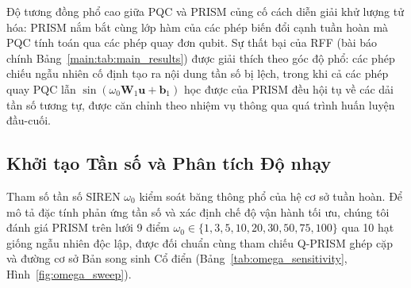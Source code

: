 \documentclass[10pt,twocolumn,letterpaper]{article}
\begin{document}
\noindent Độ tương đồng phổ cao giữa PQC và PRISM củng cố cách diễn giải khử lượng tử hóa: PRISM nắm bắt cùng lớp hàm của các phép biến đổi cạnh tuần hoàn mà PQC tính toán qua các phép quay đơn qubit. Sự thất bại của RFF (bài báo chính Bảng~\ref{main:tab:main_results}) được giải thích theo góc độ phổ: các phép chiếu ngẫu nhiên cố định tạo ra nội dung tần số bị lệch, trong khi cả các phép quay PQC lẫn $\sin(\omega_0 \mathbf{W}_1 \mathbf{u} + \mathbf{b}_1)$ học được của PRISM đều hội tụ về các dải tần số tương tự, được căn chỉnh theo nhiệm vụ thông qua quá trình huấn luyện đầu-cuối.

\subsection{Khởi tạo Tần số và Phân tích Độ nhạy}

Tham số tần số SIREN $\omega_0$ kiểm soát băng thông phổ của hệ cơ sở tuần hoàn. Để mô tả đặc tính phản ứng tần số và xác định chế độ vận hành tối ưu, chúng tôi đánh giá PRISM trên lưới 9 điểm $\omega_0 \in \{1, 3, 5, 10, 20, 30, 50, 75, 100\}$ qua 10 hạt giống ngẫu nhiên độc lập, được đối chuẩn cùng tham chiếu Q-PRISM ghép cặp và đường cơ sở Bản song sinh Cổ điển (Bảng~\ref{tab:omega_sensitivity}, Hình~\ref{fig:omega_sweep}).
\end{document}
